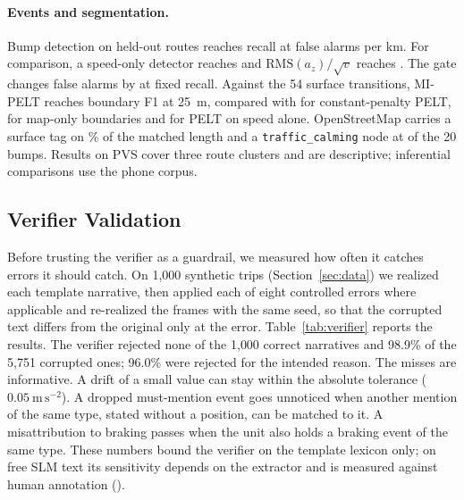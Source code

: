 \paragraph{Events and segmentation.}
Bump detection on held-out routes reaches recall \TBD{} at \TBD{} false alarms per km.
For comparison, a speed-only detector reaches \TBD{} and $\mathrm{RMS}(a_z)/\sqrt v$ reaches \TBD{}.
The gate changes false alarms by \TBD{} at fixed recall.
Against the 54 surface transitions, MI-PELT reaches boundary F1 \TBD{} at 25~m, compared with \TBD{} for constant-penalty PELT, \TBD{} for map-only boundaries and \TBD{} for PELT on speed alone.
OpenStreetMap carries a surface tag on \TBD{}\% of the matched length and a \texttt{traffic\_calming} node at \TBD{} of the 20 bumps.
Results on PVS cover three route clusters and are descriptive; inferential comparisons use the phone corpus.

\subsection{Verifier Validation}
\label{sec:verifier}

Before trusting the verifier as a guardrail, we measured how often it catches errors it should catch.
On 1{,}000 synthetic trips (Section~\ref{sec:data}) we realized each template narrative, then applied each of eight controlled errors where applicable and re-realized the frames with the same seed, so that the corrupted text differs from the original only at the error.
Table~\ref{tab:verifier} reports the results.
The verifier rejected none of the 1{,}000 correct narratives and 98.9\% of the 5{,}751 corrupted ones; 96.0\% were rejected for the intended reason.
The misses are informative.
A drift of a small value can stay within the absolute tolerance ($0.05~\mathrm{m\,s^{-2}}$).
A dropped must-mention event goes unnoticed when another mention of the same type, stated without a position, can be matched to it.
A misattribution to braking passes when the unit also holds a braking event of the same type.
These numbers bound the verifier on the template lexicon only; on free SLM text its sensitivity depends on the extractor and is measured against human annotation (\TBD{}).

